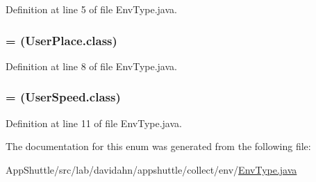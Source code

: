 \-Definition at line 5 of file \-Env\-Type.\-java.

\hypertarget{enumlab_1_1davidahn_1_1appshuttle_1_1collect_1_1env_1_1_env_type_a9be23479dc6fcfb275eb596bd226b914}{
\subsubsection[{\-P\-L\-A\-C\-E}]{ = (\-User\-Place.\-class)}}\label{enumlab_1_1davidahn_1_1appshuttle_1_1collect_1_1env_1_1_env_type_a9be23479dc6fcfb275eb596bd226b914}


\-Definition at line 8 of file \-Env\-Type.\-java.

\hypertarget{enumlab_1_1davidahn_1_1appshuttle_1_1collect_1_1env_1_1_env_type_ab7601899c6c2f54cbcc22c61b80e787d}{
\subsubsection[{\-S\-P\-E\-E\-D}]{ = (\-User\-Speed.\-class)}}\label{enumlab_1_1davidahn_1_1appshuttle_1_1collect_1_1env_1_1_env_type_ab7601899c6c2f54cbcc22c61b80e787d}


\-Definition at line 11 of file \-Env\-Type.\-java.



\-The documentation for this enum was generated from the following file\-:\begin{DoxyCompactItemize}
\item 
\-App\-Shuttle/src/lab/davidahn/appshuttle/collect/env/\hyperlink{_env_type_8java}{\-Env\-Type.\-java}\end{DoxyCompactItemize}
